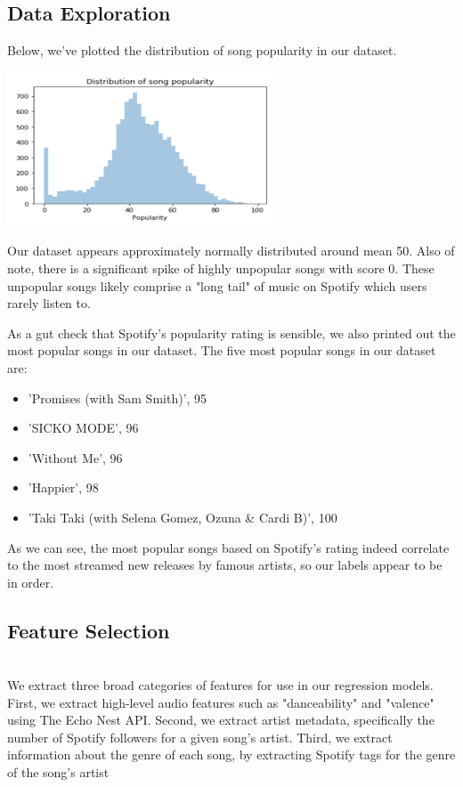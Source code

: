 \documentclass[journal]{IEEEtran}
\begin{document}
\subsection{Data Exploration}

Below, we've plotted the distribution of song popularity in our dataset.

\includegraphics[width=8cm]{images/popularity_distribution.png}

Our dataset appears approximately normally distributed around mean 50. Also of note, there is a significant spike of highly unpopular songs with score 0. These unpopular songs likely comprise a "long tail" of music on Spotify which users rarely listen to.

As a gut check that Spotify's popularity rating is sensible, we also printed out the most popular songs in our dataset. The five most popular songs in our dataset are:
\begin{itemize}
  \item 'Promises (with Sam Smith)', 95
  \item 'SICKO MODE', 96
  \item 'Without Me', 96
  \item 'Happier', 98
  \item 'Taki Taki (with Selena Gomez, Ozuna & Cardi B)', 100
\end{itemize}

As we can see, the most popular songs based on Spotify's rating indeed correlate to the most streamed new releases by famous artists, so our labels appear to be in order.

\subsection{Feature Selection} \\
We extract three broad categories of features for use in our regression models. First, we extract high-level audio features such as "danceability" and "valence" using The Echo Nest API. Second, we extract artist metadata, specifically the number of Spotify followers for a given song's artist. Third, we extract information about the genre of each song, by extracting Spotify tags for the genre of the song's artist \\
\end{document}
